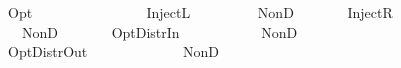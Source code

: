 \ \ {\isacharbar}\ {\isachardoublequoteopen}\ {\isacharparenleft}Opt\ \ \ \ {\isacharequal}\isanewline
\ \ \ \ \ \ \ \isanewline
\ \ {\isacharbar}\ {\isachardoublequoteopen}\ {\isacharparenleft}InjectL\ \ \ {\isacharequal}\isanewline
\ \ \ \ \ \ NonD\ \ \ \isanewline
\ \ {\isacharbar}\ {\isachardoublequoteopen}\ {\isacharparenleft}InjectR\ \ \ {\isacharequal}\isanewline
\ \ \ \ \ \ NonD\ \ \ \isanewline
\ \ {\isacharbar}\ {\isachardoublequoteopen}\ {\isacharparenleft}OptDistrIn\ \ \ \ \ {\isacharequal}\isanewline
\ \ \ \ \ \ NonD\ \ {\isacharparenleft}\ {\isasymodot}\ \ {\isacharparenleft}\ {\isasymodot}\ \isanewline
\ \ {\isacharbar}\ {\isachardoublequoteopen}\ {\isacharparenleft}OptDistrOut\ \ \ \ \ {\isacharequal}\isanewline
\ \ \ \ \ \ \ {\isasymodot}\ {\isacharparenleft}NonD\ \ \ 
